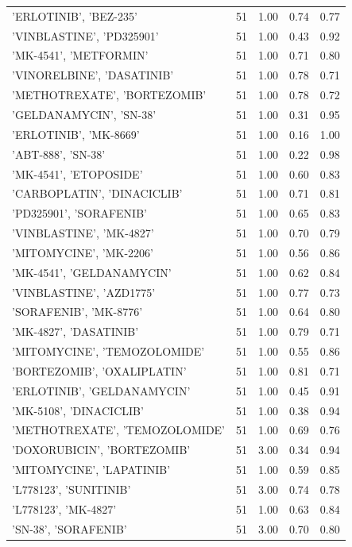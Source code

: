 \begin{center}
\begin{longtable}{@{}lcccc@{}}
    'ERLOTINIB', 'BEZ-235' & 51 & 1.00 & 0.74 & 0.77 \\
    'VINBLASTINE', 'PD325901' & 51 & 1.00 & 0.43 & 0.92 \\
    'MK-4541', 'METFORMIN' & 51 & 1.00 & 0.71 & 0.80 \\
    'VINORELBINE', 'DASATINIB' & 51 & 1.00 & 0.78 & 0.71 \\
    'METHOTREXATE', 'BORTEZOMIB' & 51 & 1.00 & 0.78 & 0.72 \\
    'GELDANAMYCIN', 'SN-38' & 51 & 1.00 & 0.31 & 0.95 \\
    'ERLOTINIB', 'MK-8669' & 51 & 1.00 & 0.16 & 1.00 \\
    'ABT-888', 'SN-38' & 51 & 1.00 & 0.22 & 0.98 \\
    'MK-4541', 'ETOPOSIDE' & 51 & 1.00 & 0.60 & 0.83 \\
    'CARBOPLATIN', 'DINACICLIB' & 51 & 1.00 & 0.71 & 0.81 \\
    'PD325901', 'SORAFENIB' & 51 & 1.00 & 0.65 & 0.83 \\
    'VINBLASTINE', 'MK-4827' & 51 & 1.00 & 0.70 & 0.79 \\
    'MITOMYCINE', 'MK-2206' & 51 & 1.00 & 0.56 & 0.86 \\
    'MK-4541', 'GELDANAMYCIN' & 51 & 1.00 & 0.62 & 0.84 \\
    'VINBLASTINE', 'AZD1775' & 51 & 1.00 & 0.77 & 0.73 \\
    'SORAFENIB', 'MK-8776' & 51 & 1.00 & 0.64 & 0.80 \\
    'MK-4827', 'DASATINIB' & 51 & 1.00 & 0.79 & 0.71 \\
    'MITOMYCINE', 'TEMOZOLOMIDE' & 51 & 1.00 & 0.55 & 0.86 \\
    'BORTEZOMIB', 'OXALIPLATIN' & 51 & 1.00 & 0.81 & 0.71 \\
    'ERLOTINIB', 'GELDANAMYCIN' & 51 & 1.00 & 0.45 & 0.91 \\
    'MK-5108', 'DINACICLIB' & 51 & 1.00 & 0.38 & 0.94 \\
    'METHOTREXATE', 'TEMOZOLOMIDE' & 51 & 1.00 & 0.69 & 0.76 \\
    'DOXORUBICIN', 'BORTEZOMIB' & 51 & 3.00 & 0.34 & 0.94 \\
    'MITOMYCINE', 'LAPATINIB' & 51 & 1.00 & 0.59 & 0.85 \\
    'L778123', 'SUNITINIB' & 51 & 3.00 & 0.74 & 0.78 \\
    'L778123', 'MK-4827' & 51 & 1.00 & 0.63 & 0.84 \\
    'SN-38', 'SORAFENIB' & 51 & 3.00 & 0.70 & 0.80 \\

\end{longtable}
\end{center}
